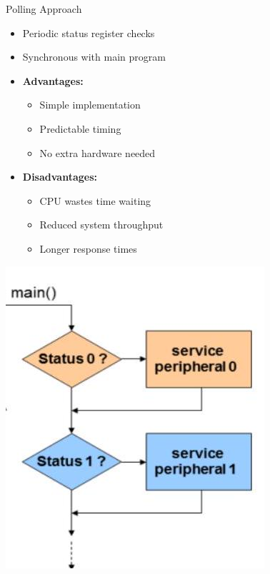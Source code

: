 \begin{concept}{Polling Approach}

  \begin{minipage}{0.5\linewidth}
\begin{itemize}
  \item Periodic status register checks
  \item Synchronous with main program
  \item \textbf{Advantages:}
    \begin{itemize}
      \item Simple implementation
      \item Predictable timing
      \item No extra hardware needed
    \end{itemize}
  \item \textbf{Disadvantages:}
    \begin{itemize}
      \item CPU wastes time waiting
      \item Reduced system throughput
      \item Longer response times
    \end{itemize}
\end{itemize}
\end{minipage}
\begin{minipage}{0.5\linewidth}
\includegraphics[width=\linewidth]{images/2024_12_29_79e6b22f503fb7b4f718g-11(1)}
\end{minipage}
\end{concept}

